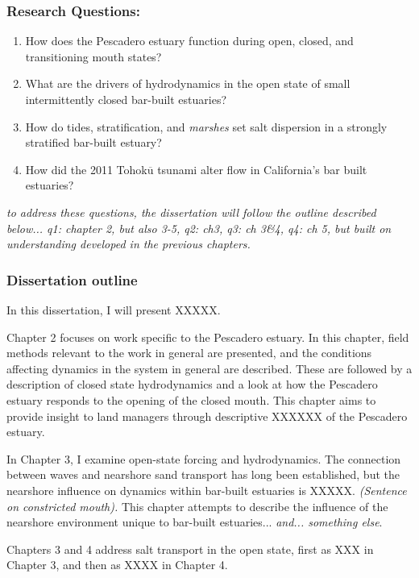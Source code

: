 \subsubsection{Research Questions:}
\begin{enumerate}
	\item{How does the Pescadero estuary function during open, closed, and transitioning mouth states?}
	\item{What are the drivers of hydrodynamics in the open state of small intermittently closed bar-built estuaries?}
	\item{How do tides, stratification, and \emph{marshes} set salt dispersion in a strongly stratified bar-built estuary?}
	\item{How did the 2011 Tohok$\overline{\mathrm{u}}$ tsunami alter flow in California's bar built estuaries?}
\end{enumerate}

\emph{to address these questions, the dissertation will follow the outline described below... q1: chapter 2, but also 3-5, q2: ch3, q3: ch 3\&4, q4: ch 5, but built on understanding developed in the previous chapters.}


\subsubsection{Dissertation outline}

In this dissertation, I will present XXXXX.

Chapter 2 focuses on work specific to the Pescadero estuary. In this chapter, field methods relevant to the work in general are presented, and the conditions affecting dynamics in the system in general are described. These are followed by a description of closed state hydrodynamics and a look at how the Pescadero estuary responds to the opening of the closed mouth. This chapter aims to provide insight to land managers through descriptive XXXXXX of the Pescadero estuary.

In Chapter 3, I examine open-state forcing and hydrodynamics. The connection between waves and nearshore sand transport has long been established, but the nearshore influence on dynamics within bar-built estuaries is XXXXX. \emph{(Sentence on constricted mouth).} This chapter attempts to describe the influence of the nearshore environment unique to bar-built estuaries... \emph{and... something else}. 

Chapters 3 and 4 address salt transport in the open state, first as XXX in Chapter 3, and then as XXXX in Chapter 4. 

